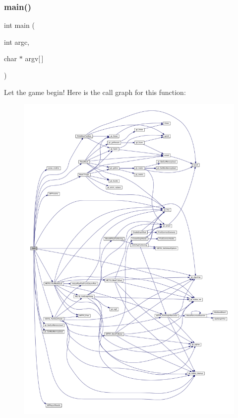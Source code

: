 \subsubsection{\texorpdfstring{main()}{main()}}
{\footnotesize\ttfamily int main (\begin{DoxyParamCaption}\item[{int}]{argc,  }\item[{char $\ast$}]{argv\mbox{[}$\,$\mbox{]} }\end{DoxyParamCaption})}

Let the game begin! Here is the call graph for this function\+:\nopagebreak
\begin{figure}[H]
\begin{center}
\leavevmode
\includegraphics[width=350pt]{a00323_a0ddf1224851353fc92bfbff6f499fa97_cgraph}
\end{center}
\end{figure}
\mbox{\label{a00323_a921bb5a29825f90d7095365cc3e92bdc}} 
